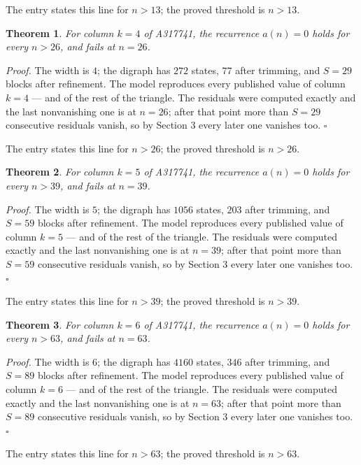 \documentclass[11pt]{article}
\newtheorem{theorem}{Theorem}
\theoremstyle{definition}
\begin{document}
The entry states this line for $n > 13$; the proved threshold is $n > 13$.

\begin{theorem} For column $k = 4$ of A317741, the recurrence $a(n) = 0$ holds for every $n > 26$, and fails at $n = 26$.\end{theorem}

{\itshape Proof.} The width is $4$; the digraph has $272$ states, $77$ after trimming, and $S = 29$ blocks after refinement. The model reproduces every published value of column $k = 4$ --- and of the rest of the triangle. The residuals were computed exactly and the last nonvanishing one is at $n = 26$; after that point more than $S = 29$ consecutive residuals vanish, so by Section 3 every later one vanishes too. $\square$

The entry states this line for $n > 26$; the proved threshold is $n > 26$.

\begin{theorem} For column $k = 5$ of A317741, the recurrence $a(n) = 0$ holds for every $n > 39$, and fails at $n = 39$.\end{theorem}

{\itshape Proof.} The width is $5$; the digraph has $1056$ states, $203$ after trimming, and $S = 59$ blocks after refinement. The model reproduces every published value of column $k = 5$ --- and of the rest of the triangle. The residuals were computed exactly and the last nonvanishing one is at $n = 39$; after that point more than $S = 59$ consecutive residuals vanish, so by Section 3 every later one vanishes too. $\square$

The entry states this line for $n > 39$; the proved threshold is $n > 39$.

\begin{theorem} For column $k = 6$ of A317741, the recurrence $a(n) = 0$ holds for every $n > 63$, and fails at $n = 63$.\end{theorem}

{\itshape Proof.} The width is $6$; the digraph has $4160$ states, $346$ after trimming, and $S = 89$ blocks after refinement. The model reproduces every published value of column $k = 6$ --- and of the rest of the triangle. The residuals were computed exactly and the last nonvanishing one is at $n = 63$; after that point more than $S = 89$ consecutive residuals vanish, so by Section 3 every later one vanishes too. $\square$

The entry states this line for $n > 63$; the proved threshold is $n > 63$.
\end{document}
